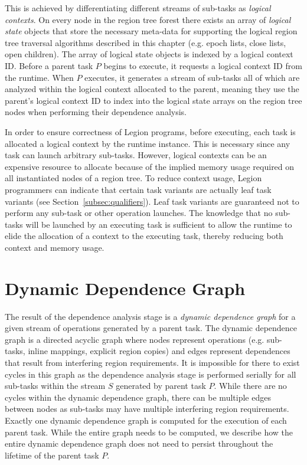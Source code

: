 This is achieved by differentiating
different streams of sub-tasks as {\em logical
contexts}.  On every node in the region tree
forest there exists an array of {\em logical
state} objects that store the necessary meta-data
for supporting the logical region tree traversal
algorithms described in this chapter (e.g. 
epoch lists, close lists, open children). The
array of logical state objects is indexed by a
logical context ID. Before a parent task $P$
begins to execute, it requests a logical context
ID from the runtime.  When $P$ executes,
it generates a stream of sub-tasks all of which
are analyzed within the logical context allocated
to the parent, meaning they use the parent's
logical context ID to index into the logical
state arrays on the region tree nodes when
performing their dependence analysis.

In order to ensure correctness of Legion programs,
before executing, each task is allocated a logical 
context by the runtime instance. This is necessary 
since any task can launch arbitrary sub-tasks.  
However, logical contexts can be an expensive 
resource to allocate because of the implied memory
usage required on all instantiated nodes of a region
tree. To reduce context usage, Legion programmers
can indicate that certain task variants are 
actually leaf task variants 
(see Section~\ref{subsec:qualifiers}).  Leaf task
variants are guaranteed not to perform any sub-task
or other operation launches.
The knowledge that no sub-tasks will be launched
by an executing task is sufficient to allow the
runtime to elide the allocation of a context to 
the executing task, thereby reducing both context 
and memory usage.

\section{Dynamic Dependence Graph}
\label{sec:mapdepgraph}
The result of the dependence analysis stage
is a {\em dynamic dependence graph} for a
given stream of operations generated by a parent 
task. The dynamic dependence graph is a directed 
acyclic graph where nodes represent operations 
(e.g. sub-tasks, inline mappings, explicit region
copies) and edges represent dependences that
result from interfering region requirements.
It is impossible for there to exist cycles in
this graph as the dependence analysis stage
is performed serially for all sub-tasks
within the stream $S$ generated by parent 
task $P$. While there are no
cycles within the dynamic dependence graph,
there can be multiple edges between nodes as
sub-tasks may have multiple interfering 
region requirements. Exactly one dynamic
dependence graph is computed for the execution
of each parent task. While the entire graph
needs to be computed, we describe how the
entire dynamic dependence graph does not
need to persist throughout the lifetime of
the parent task $P$.

